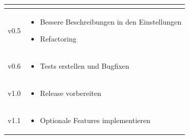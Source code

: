 \begin{table}[H]
\begin{tabular}{>{\centering\arraybackslash}m{} | m{} }
\begin{itemize}[leftmargin=*,itemsep=0pt]
  \end{itemize} \\
  \hline
  v0.5 & \begin{itemize}[leftmargin=*,itemsep=0pt]
    \item Bessere Beschreibungen in den Einstellungen
    \item Refactoring
  \end{itemize} \\
  \hline
  v0.6 & \begin{itemize}[leftmargin=*,itemsep=0pt]
    \item Tests erstellen und Bugfixen
  \end{itemize} \\
  \hline
  v1.0 & \begin{itemize}[leftmargin=*,itemsep=0pt]
    \item Release vorbereiten
  \end{itemize} \\
  \hline
  v1.1 & \begin{itemize}[leftmargin=*,itemsep=0pt]
    \item Optionale Features implementieren
  \end{itemize} \\
\end{tabular}
\end{table}
